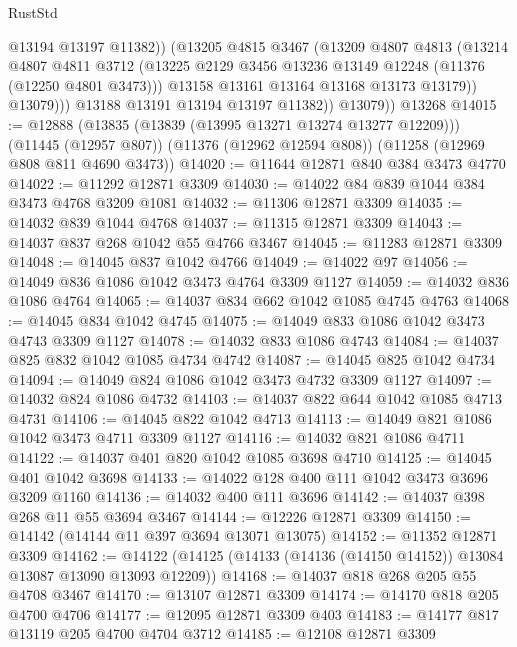 \begin{lexlean}{RustStd}
\begin{coremodule}
{{{{{{{{{{{{{{{{{{{                    @13194
                    @13197
                    @11382))
                (@13205
                  @4815
                  @3467
                  (@13209
                    @4807
                    @4813
                    (@13214
                      @4807
                      @4811
                      @3712
                      (@13225 @2129 @3456 @13236 @13149 @12248 (@11376 (@12250 @4801 @3473)))
                      @13158
                      @13161
                      @13164
                      @13168
                      @13173
                      @13179))
                  @13079)))
            @13188
            @13191
            @13194
            @13197
            @11382))
        @13079))
    @13268
@14015 := @12888
    (@13835 (@13839 (@13995 @13271 @13274 @13277 @12209)))
    (@11445 (@12957 @807))
    (@11376 (@12962 @12594 @808))
    (@11258 (@12969 @808 @811 @4690 @3473))
@14020 := @11644 @12871 @840 @384 @3473 @4770
@14022 := @11292 @12871 @3309
@14030 := @14022 @84 @839 @1044 @384 @3473 @4768 @3209 @1081
@14032 := @11306 @12871 @3309
@14035 := @14032 @839 @1044 @4768
@14037 := @11315 @12871 @3309
@14043 := @14037 @837 @268 @1042 @55 @4766 @3467
@14045 := @11283 @12871 @3309
@14048 := @14045 @837 @1042 @4766
@14049 := @14022 @97
@14056 := @14049 @836 @1086 @1042 @3473 @4764 @3309 @1127
@14059 := @14032 @836 @1086 @4764
@14065 := @14037 @834 @662 @1042 @1085 @4745 @4763
@14068 := @14045 @834 @1042 @4745
@14075 := @14049 @833 @1086 @1042 @3473 @4743 @3309 @1127
@14078 := @14032 @833 @1086 @4743
@14084 := @14037 @825 @832 @1042 @1085 @4734 @4742
@14087 := @14045 @825 @1042 @4734
@14094 := @14049 @824 @1086 @1042 @3473 @4732 @3309 @1127
@14097 := @14032 @824 @1086 @4732
@14103 := @14037 @822 @644 @1042 @1085 @4713 @4731
@14106 := @14045 @822 @1042 @4713
@14113 := @14049 @821 @1086 @1042 @3473 @4711 @3309 @1127
@14116 := @14032 @821 @1086 @4711
@14122 := @14037 @401 @820 @1042 @1085 @3698 @4710
@14125 := @14045 @401 @1042 @3698
@14133 := @14022 @128 @400 @111 @1042 @3473 @3696 @3209 @1160
@14136 := @14032 @400 @111 @3696
@14142 := @14037 @398 @268 @11 @55 @3694 @3467
@14144 := @12226 @12871 @3309
@14150 := @14142 (@14144 @11 @397 @3694 @13071 @13075)
@14152 := @11352 @12871 @3309
@14162 := @14122 (@14125 (@14133 (@14136 (@14150 @14152)) @13084 @13087 @13090 @13093 @12209))
@14168 := @14037 @818 @268 @205 @55 @4708 @3467
@14170 := @13107 @12871 @3309
@14174 := @14170 @818 @205 @4700 @4706
@14177 := @12095 @12871 @3309 @403
@14183 := @14177 @817 @13119 @205 @4700 @4704 @3712
@14185 := @12108 @12871 @3309
}}}}}}}}}}}}}}}}}}}
\end{coremodule}
\end{lexlean}

